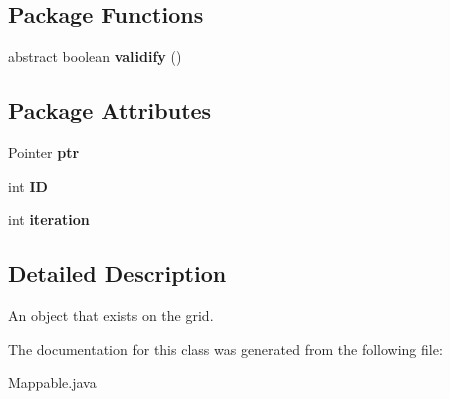 \subsection*{Package Functions}
\begin{DoxyCompactItemize}
\item 
\hypertarget{classMappable_a44110b96b960e4a1f88a4ca901fa6711}{
abstract boolean {\bfseries validify} ()}
\label{classMappable_a44110b96b960e4a1f88a4ca901fa6711}

\end{DoxyCompactItemize}
\subsection*{Package Attributes}
\begin{DoxyCompactItemize}
\item 
\hypertarget{classMappable_ad2c640bd53c0b3aaf4f9a0ad2a49ad4a}{
Pointer {\bfseries ptr}}
\label{classMappable_ad2c640bd53c0b3aaf4f9a0ad2a49ad4a}

\item 
\hypertarget{classMappable_a401f51d6357763ce46990bbf1b24ac6f}{
int {\bfseries ID}}
\label{classMappable_a401f51d6357763ce46990bbf1b24ac6f}

\item 
\hypertarget{classMappable_a6c9c8824cf37b751712803805e2feb68}{
int {\bfseries iteration}}
\label{classMappable_a6c9c8824cf37b751712803805e2feb68}

\end{DoxyCompactItemize}


\subsection{Detailed Description}
An object that exists on the grid. 

The documentation for this class was generated from the following file:\begin{DoxyCompactItemize}
\item 
Mappable.java\end{DoxyCompactItemize}
